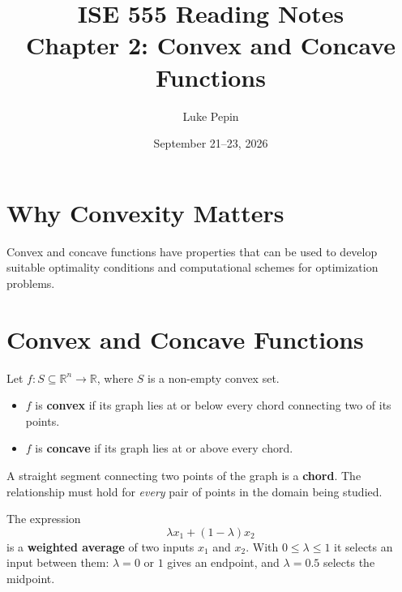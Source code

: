 \documentclass[11pt]{article}
\title{ISE 555 Reading Notes\\\large Chapter 2: Convex and Concave Functions}
\author{Luke Pepin}
\date{September 21--23, 2026}
\begin{document}
\maketitle

\section{Why Convexity Matters}

Convex and concave functions have properties that can be used to develop suitable
optimality conditions and computational schemes for optimization problems.

\section{Convex and Concave Functions}

Let $f\colon S \subseteq \mathbb{R}^n \to \mathbb{R}$, where $S$ is a non-empty
convex set.
\begin{itemize}
    \item $f$ is \textbf{convex} if its graph lies at or below every chord
          connecting two of its points.
    \item $f$ is \textbf{concave} if its graph lies at or above every chord.
\end{itemize}

\begin{center}
\end{center}

A straight segment connecting two points of the graph is a \textbf{chord}. The
relationship must hold for \emph{every} pair of points in the domain being studied.

The expression
\[
    \lambda x_1 + (1-\lambda) x_2
\]
is a \textbf{weighted average} of two inputs $x_1$ and $x_2$. With
$0 \le \lambda \le 1$ it selects an input between them: $\lambda = 0$ or $1$ gives
an endpoint, and $\lambda = 0.5$ selects the midpoint.
\end{document}
